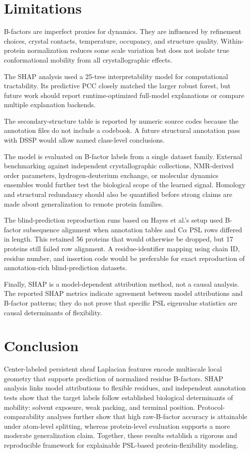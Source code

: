 \documentclass[11pt]{article}
\newcommand{\calpha}{C\ensuremath{\alpha}\xspace}
\begin{document}
\section{Limitations}
B-factors are imperfect proxies for dynamics. They are influenced by refinement choices, crystal contacts, temperature, occupancy, and structure quality. Within-protein normalization reduces some scale variation but does not isolate true conformational mobility from all crystallographic effects.

The SHAP analysis used a 25-tree interpretability model for computational tractability. Its predictive PCC closely matched the larger robust forest, but future work should report runtime-optimized full-model explanations or compare multiple explanation backends.

The secondary-structure table is reported by numeric source codes because the annotation files do not include a codebook. A future structural annotation pass with DSSP would allow named class-level conclusions.

The model is evaluated on B-factor labels from a single dataset family. External benchmarking against independent crystallographic collections, NMR-derived order parameters, hydrogen-deuterium exchange, or molecular dynamics ensembles would further test the biological scope of the learned signal. Homology and structural redundancy should also be quantified before strong claims are made about generalization to remote protein families.

The blind-prediction reproduction runs based on Hayes et al.'s setup used B-factor subsequence alignment when annotation tables and \calpha PSL rows differed in length. This retained 56 proteins that would otherwise be dropped, but 17 proteins still failed row alignment. A residue-identifier mapping using chain ID, residue number, and insertion code would be preferable for exact reproduction of annotation-rich blind-prediction datasets.

Finally, SHAP is a model-dependent attribution method, not a causal analysis. The reported SHAP metrics indicate agreement between model attributions and B-factor patterns; they do not prove that specific PSL eigenvalue statistics are causal determinants of flexibility.

\section{Conclusion}
Center-labeled persistent sheaf Laplacian features encode multiscale local geometry that supports prediction of normalized residue B-factors. SHAP analysis links model attributions to flexible residues, and independent annotation tests show that the target labels follow established biological determinants of mobility: solvent exposure, weak packing, and terminal position. Protocol-comparability analyses further show that high raw-B-factor accuracy is attainable under atom-level splitting, whereas protein-level evaluation supports a more moderate generalization claim. Together, these results establish a rigorous and reproducible framework for explainable PSL-based protein-flexibility modeling.
\end{document}
